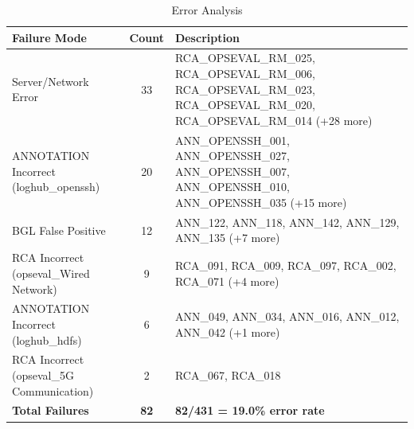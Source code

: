 \begin{table}[h]
\centering
\caption{Error Analysis}
\label{tab:error-analysis}
\begin{tabular}{lcp{8cm}}
\toprule
\textbf{Failure Mode} & \textbf{Count} & \textbf{Description} \\
\midrule
Server/Network Error & 33 & RCA_OPSEVAL_RM_025, RCA_OPSEVAL_RM_006, RCA_OPSEVAL_RM_023, RCA_OPSEVAL_RM_020, RCA_OPSEVAL_RM_014 (+28 more) \\
ANNOTATION Incorrect (loghub_openssh) & 20 & ANN_OPENSSH_001, ANN_OPENSSH_027, ANN_OPENSSH_007, ANN_OPENSSH_010, ANN_OPENSSH_035 (+15 more) \\
BGL False Positive & 12 & ANN_122, ANN_118, ANN_142, ANN_129, ANN_135 (+7 more) \\
RCA Incorrect (opseval_Wired Network) & 9 & RCA_091, RCA_009, RCA_097, RCA_002, RCA_071 (+4 more) \\
ANNOTATION Incorrect (loghub_hdfs) & 6 & ANN_049, ANN_034, ANN_016, ANN_012, ANN_042 (+1 more) \\
RCA Incorrect (opseval_5G Communication) & 2 & RCA_067, RCA_018 \\
\midrule
\textbf{Total Failures} & \textbf{82} & \textbf{82/431 = 19.0\% error rate} \\
\bottomrule
\end{tabular}
\end{table}

